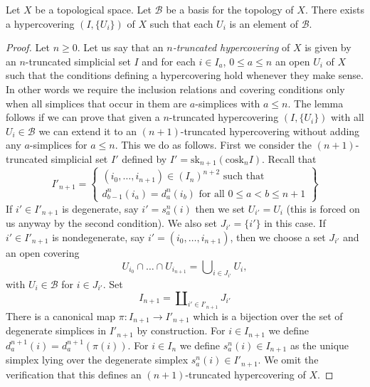 \begin{lemma}
\label{lemma-basis-hypercovering}
Let $X$ be a topological space.
Let $\mathcal{B}$ be a basis for the topology of $X$.
There exists a hypercovering $(I, \{U_i\})$ of $X$
such that each $U_i$ is an element of $\mathcal{B}$.
\end{lemma}

\begin{proof}
Let $n \geq 0$.
Let us say that an {\it $n$-truncated hypercovering} of $X$ is
given by an $n$-truncated simplicial set $I$ and for each
$i \in I_a$, $0 \leq a \leq n$ an open $U_i$ of $X$ such that
the conditions defining a hypercovering hold whenever they make sense.
In other words we require the inclusion relations and covering
conditions only when all simplices that occur in them
are $a$-simplices with $a \leq n$. The lemma follows if we can prove
that given a $n$-truncated hypercovering $(I, \{U_i\})$ with
all $U_i \in \mathcal{B}$ we can extend it to an $(n + 1)$-truncated
hypercovering without adding any $a$-simplices for $a \leq n$.
This we do as follows. First we consider the $(n + 1)$-truncated
simplicial set $I'$ defined by
$I' = \text{sk}_{n + 1}(\text{cosk}_n I)$.
Recall that
$$
I'_{n + 1} =
\left\{
\begin{matrix}
(i_0, \ldots, i_{n + 1}) \in (I_n)^{n + 2} \text{ such that}\\
d^n_{b - 1}(i_a) = d^n_a(i_b) \text{ for all }0\leq a < b\leq n + 1
\end{matrix}
\right\}
$$
If $i' \in I'_{n + 1}$ is degenerate, say $i' = s^n_a(i)$ then we set
$U_{i'} = U_i$ (this is forced on us anyway by the second condition).
We also set $J_{i'} = \{i'\}$ in this case.
If $i' \in I'_{n + 1}$ is nondegenerate, say
$i' = (i_0, \ldots, i_{n + 1})$, then we choose a set
$J_{i'}$ and an open covering
\begin{equation}
\label{equation-choose-covering}
U_{i_0} \cap \ldots \cap U_{i_{n + 1}} =
\bigcup\nolimits_{i \in J_{i'}} U_i,
\end{equation}
with $U_i \in \mathcal{B}$ for $i \in J_{i'}$.
Set
$$
I_{n + 1} = \coprod\nolimits_{i' \in I'_{n + 1}} J_{i'}
$$
There is a canonical map $\pi : I_{n + 1} \to I'_{n + 1}$ which is
a bijection over the set of degenerate simplices in $I'_{n + 1}$ by
construction.
For $i \in I_{n + 1}$ we define $d^{n + 1}_a(i) = d^{n + 1}_a(\pi(i))$.
For $i \in I_n$ we define $s^n_a(i) \in I_{n + 1}$ as the unique
simplex lying over the degenerate simplex $s^n_a(i) \in I'_{n + 1}$.
We omit the verification that this defines an $(n + 1)$-truncated
hypercovering of $X$.
\end{proof}

